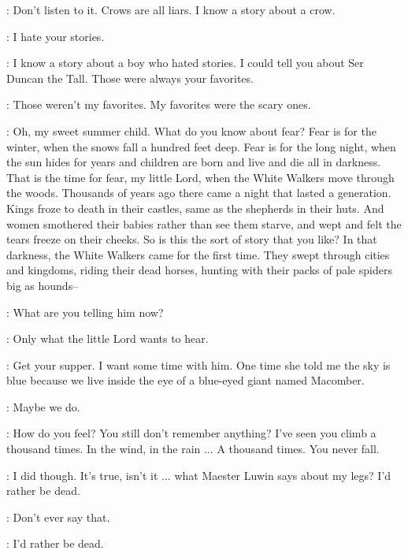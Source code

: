 \scene



\OLDNAN: Don't listen to it. Crows are all liars. I know a story about a crow. 

\BRAN: I hate your stories. 

\OLDNAN: I know a story about a boy who hated stories. I could tell you about Ser Duncan the Tall. Those were always your favorites. 

\BRAN: Those weren't my favorites. My favorites were the scary ones. 

\OLDNAN: Oh, my sweet summer child. What do you know about fear? Fear is for the winter, when the snows fall a hundred feet deep. Fear is for the long night, when the sun hides for years and children are born and live and die all in darkness. That is the time for fear, my little Lord, when the White Walkers move through the woods. Thousands of years ago there came a night that lasted a generation. Kings froze to death in their castles, same as the shepherds in their huts. And women smothered their babies rather than see them starve, and wept and felt the tears freeze on their cheeks. So is this the sort of story that you like? In that darkness, the White Walkers came for the first time. They swept through cities and kingdoms, riding their dead horses, hunting with their packs of pale spiders big as hounds--


\ROBB: What are you telling him now? 

\OLDNAN: Only what the little Lord wants to hear. 

\ROBB: Get your supper. I want some time with him.  One time she told me the sky is blue because we live inside the eye of a blue-eyed giant named Macomber. 

\BRAN: Maybe we do. 

\ROBB: How do you feel? You still don't remember anything? I've seen you climb a thousand times. In the wind, in the rain $\ldots$ A thousand times. You never fall. 

\BRAN: I did though. It's true, isn't it $\ldots$ what Maester Luwin says about my legs? I'd rather be dead. 

\ROBB: Don't ever say that. 

\BRAN: I'd rather be dead. 

\scene

